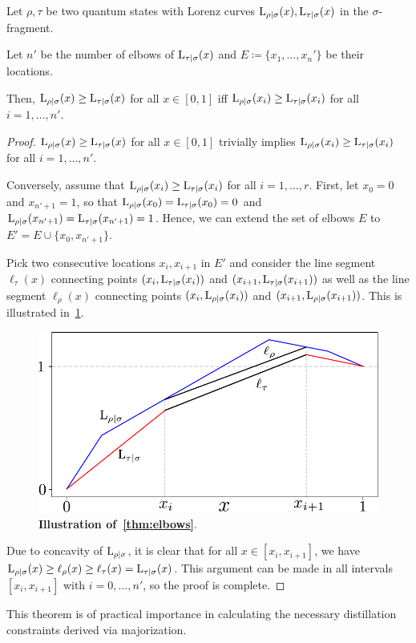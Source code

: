 \begin{theorem}
	Let $\rho, \tau$ be two quantum states with Lorenz curves ${{\rm{L}}_{\rho|\sigma}}(x), {{\rm{L}}_{\tau|\sigma}}(x)$ in the $\sigma$-fragment.
	
	Let $n'$ be the number of elbows of ${{\rm{L}}_{\tau|\sigma}}(x)$ and $E \coloneqq \{x_1, \dots, x_n'\}$ be their locations.
	
	Then, ${{\rm{L}}_{\rho|\sigma}}(x) \geq {{\rm{L}}_{\tau|\sigma}}(x)$ for all $x \in [0,1]$ iff ${{\rm{L}}_{\rho|\sigma}}(x_{i}) \geq {{\rm{L}}_{\tau|\sigma}}(x_{i})$ for all $i =1,\dots,n'$.
\end{theorem}
\begin{proof}	
	${{\rm{L}}_{\rho|\sigma}}(x) \geq {{\rm{L}}_{\tau|\sigma}}(x)$ for all $x \in [0,1]$ trivially implies ${{\rm{L}}_{\rho|\sigma}}(x_{i}) \geq {{\rm{L}}_{\tau|\sigma}}(x_{i})$ for all $i = 1,\dots,n'$.
	
	Conversely, assume that ${{\rm{L}}_{\rho|\sigma}}(x_{i}) \geq {{\rm{L}}_{\tau|\sigma}}(x_{i})$ for all $i = 1,\dots,r$.
	First, let $x_0 = 0$ and $x_{n'+1} = 1$, so that ${{\rm{L}}_{\rho|\sigma}}(x_0) = {{\rm{L}}_{\tau|\sigma}}(x_0) = 0$ and ${{\rm{L}}_{\rho|\sigma}}(x_{n'+1}) = {{\rm{L}}_{\tau|\sigma}}(x_{n'+1}) = 1$.
	Hence, we can extend the set of elbows $E$ to $E' = E \cup \{x_0, x_{n'+1}\}$.
	
	Pick two consecutive locations $x_{i}, x_{i+1}$ in $E'$ and consider the line segment $\ell_\tau(x)$ connecting points $(x_{i}, {{\rm{L}}_{\tau|\sigma}}(x_{i}))$ and $(x_{i+1}, {{\rm{L}}_{\tau|\sigma}}(x_{i+1}))$ as well as the line segment $\ell_\rho(x)$ connecting points $(x_{i}, {{\rm{L}}_{\rho|\sigma}}(x_{i}))$ and $(x_{i+1}, {{\rm{L}}_{\rho|\sigma}}(x_{i+1}))$.
	This is illustrated in~\cref{fig:elbows_proof}.
\begin{figure}[h]
    \centering
    \includegraphics[scale=0.6]{figs/elbows_proof.pdf}
    \caption{\textbf{Illustration of~\cref{thm:elbows}}.
    }
    \label{fig:elbows_proof}
\end{figure}

	Due to concavity of ${{\rm{L}}_{\rho|\sigma}}$, it is clear that for all $x \in [x_{i}, x_{i+1}]$, we have ${{\rm{L}}_{\rho|\sigma}}(x) \geq \ell_\rho(x) \geq \ell_\tau(x) = {{\rm{L}}_{\tau|\sigma}}(x)$.
	This argument can be made in all intervals $[x_{i}, x_{i+1}]$ with $i=0,\dots,n'$, so the proof is complete.
\end{proof}
This theorem is of practical importance in calculating the necessary distillation constraints derived via majorization.

